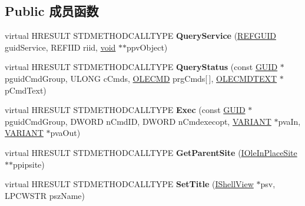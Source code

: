 \subsection*{Public 成员函数}
\begin{DoxyCompactItemize}
\item 
\mbox{\label{class_c_common_browser_a891f84509960fd1af26199801f9dd883}} 
virtual H\+R\+E\+S\+U\+LT S\+T\+D\+M\+E\+T\+H\+O\+D\+C\+A\+L\+L\+T\+Y\+PE {\bfseries Query\+Service} (\hyperlink{struct___g_u_i_d}{R\+E\+F\+G\+U\+ID} guid\+Service, R\+E\+F\+I\+ID riid, \hyperlink{interfacevoid}{void} $\ast$$\ast$ppv\+Object)
\item 
\mbox{\label{class_c_common_browser_ae13f2bce6792e35c241cf0751381d6cd}} 
virtual H\+R\+E\+S\+U\+LT S\+T\+D\+M\+E\+T\+H\+O\+D\+C\+A\+L\+L\+T\+Y\+PE {\bfseries Query\+Status} (const \hyperlink{interface_g_u_i_d}{G\+U\+ID} $\ast$pguid\+Cmd\+Group, U\+L\+O\+NG c\+Cmds, \hyperlink{struct_i_ole_command_target_1_1__tag_o_l_e_c_m_d}{O\+L\+E\+C\+MD} prg\+Cmds\mbox{[}$\,$\mbox{]}, \hyperlink{struct_i_ole_command_target_1_1__tag_o_l_e_c_m_d_t_e_x_t}{O\+L\+E\+C\+M\+D\+T\+E\+XT} $\ast$p\+Cmd\+Text)
\item 
\mbox{\label{class_c_common_browser_ad6c3203fd728ada5f58b5925c6f182bc}} 
virtual H\+R\+E\+S\+U\+LT S\+T\+D\+M\+E\+T\+H\+O\+D\+C\+A\+L\+L\+T\+Y\+PE {\bfseries Exec} (const \hyperlink{interface_g_u_i_d}{G\+U\+ID} $\ast$pguid\+Cmd\+Group, D\+W\+O\+RD n\+Cmd\+ID, D\+W\+O\+RD n\+Cmdexecopt, \hyperlink{structtag_v_a_r_i_a_n_t}{V\+A\+R\+I\+A\+NT} $\ast$pva\+In, \hyperlink{structtag_v_a_r_i_a_n_t}{V\+A\+R\+I\+A\+NT} $\ast$pva\+Out)
\item 
\mbox{\label{class_c_common_browser_a0c73546d14d8a065db689275f7175f80}} 
virtual H\+R\+E\+S\+U\+LT S\+T\+D\+M\+E\+T\+H\+O\+D\+C\+A\+L\+L\+T\+Y\+PE {\bfseries Get\+Parent\+Site} (\hyperlink{interface_i_ole_in_place_site}{I\+Ole\+In\+Place\+Site} $\ast$$\ast$ppipsite)
\item 
\mbox{\label{class_c_common_browser_aead38b41e7aa252ece6980aa3321907f}} 
virtual H\+R\+E\+S\+U\+LT S\+T\+D\+M\+E\+T\+H\+O\+D\+C\+A\+L\+L\+T\+Y\+PE {\bfseries Set\+Title} (\hyperlink{interface_i_shell_view}{I\+Shell\+View} $\ast$psv, L\+P\+C\+W\+S\+TR psz\+Name)

\end{DoxyCompactItemize}
